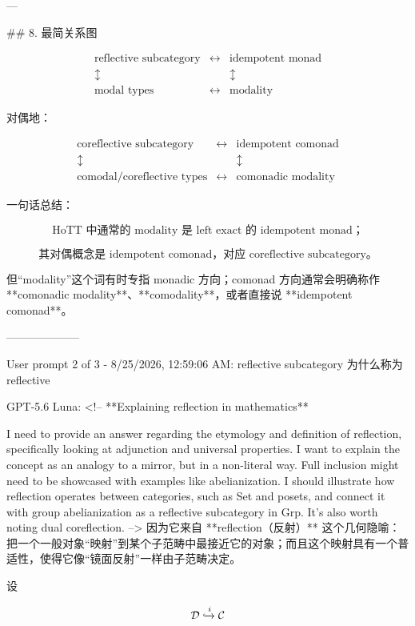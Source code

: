 \documentclass{ctexart}
\begin{document}
\begin{markdown}
---

## 8. 最简关系图

$$
\begin{array}{ccc}
\text{reflective subcategory}
&\longleftrightarrow&
\text{idempotent monad}
\\
\updownarrow && \updownarrow
\\
\text{modal types}
&\longleftrightarrow&
\text{modality}
\end{array}
$$

对偶地：

$$
\begin{array}{ccc}
\text{coreflective subcategory}
&\longleftrightarrow&
\text{idempotent comonad}
\\
\updownarrow && \updownarrow
\\
\text{comodal/coreflective types}
&\longleftrightarrow&
\text{comonadic modality}
\end{array}
$$

一句话总结：

$$
\boxed{
\text{HoTT 中通常的 modality 是 left exact 的 idempotent monad；}
}
$$

$$
\boxed{
\text{其对偶概念是 idempotent comonad，对应 coreflective subcategory。}
}
$$

但“modality”这个词有时专指 monadic 方向；comonad 方向通常会明确称作 **comonadic modality**、**comodality**，或者直接说 **idempotent comonad**。

--------------------

User prompt 2 of 3 - 8/25/2026, 12:59:06 AM:
reflective subcategory 为什么称为 reflective

GPT-5.6 Luna:
<!-- **Explaining reflection in mathematics**

I need to provide an answer regarding the etymology and definition of reflection, specifically looking at adjunction and universal properties. I want to explain the concept as an analogy to a mirror, but in a non-literal way. Full inclusion might need to be showcased with examples like abelianization. I should illustrate how reflection operates between categories, such as Set and posets, and connect it with group abelianization as a reflective subcategory in Grp. It's also worth noting dual coreflection. -->
因为它来自 **reflection（反射）** 这个几何隐喻：把一个一般对象“映射”到某个子范畴中最接近它的对象；而且这个映射具有一个普适性，使得它像“镜面反射”一样由子范畴决定。

设

$$
\mathcal D \xhookrightarrow{i} \mathcal C
$$


\end{markdown}
\end{document}
